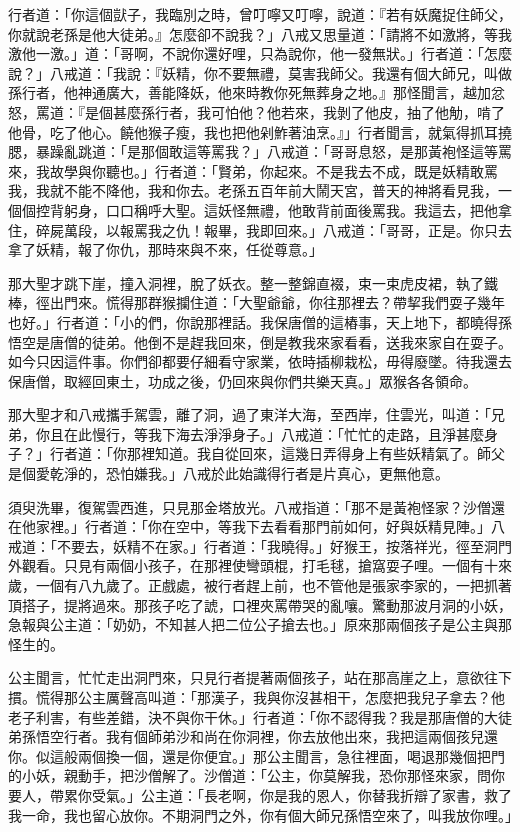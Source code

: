 行者道：「你這個獃子，我臨別之時，曾叮嚀又叮嚀，說道：『若有妖魔捉住師父，你就說老孫是他大徒弟。』怎麼卻不說我？」八戒又思量道：「請將不如激將，等我激他一激。」道：「哥啊，不說你還好哩，只為說你，他一發無狀。」行者道：「怎麼說？」八戒道：「我說：『妖精，你不要無禮，莫害我師父。我還有個大師兄，叫做孫行者，他神通廣大，善能降妖，他來時教你死無葬身之地。』那怪聞言，越加忿怒，罵道：『是個甚麼孫行者，我可怕他？他若來，我剝了他皮，抽了他觔，啃了他骨，吃了他心。饒他猴子瘦，我也把他剁鮓著油烹。』」行者聞言，就氣得抓耳撓腮，暴躁亂跳道：「是那個敢這等罵我？」八戒道：「哥哥息怒，是那黃袍怪這等罵來，我故學與你聽也。」行者道：「賢弟，你起來。不是我去不成，既是妖精敢罵我，我就不能不降他，我和你去。老孫五百年前大鬧天宮，普天的神將看見我，一個個控背躬身，口口稱呼大聖。這妖怪無禮，他敢背前面後罵我。我這去，把他拿住，碎屍萬段，以報罵我之仇！報畢，我即回來。」八戒道：「哥哥，正是。你只去拿了妖精，報了你仇，那時來與不來，任從尊意。」

那大聖才跳下崖，撞入洞裡，脫了妖衣。整一整錦直裰，束一束虎皮裙，執了鐵棒，徑出門來。慌得那群猴攔住道：「大聖爺爺，你往那裡去？帶挈我們耍子幾年也好。」行者道：「小的們，你說那裡話。我保唐僧的這樁事，天上地下，都曉得孫悟空是唐僧的徒弟。他倒不是趕我回來，倒是教我來家看看，送我來家自在耍子。如今只因這件事。你們卻都要仔細看守家業，依時插柳栽松，毋得廢墜。待我還去保唐僧，取經回東土，功成之後，仍回來與你們共樂天真。」眾猴各各領命。

那大聖才和八戒攜手駕雲，離了洞，過了東洋大海，至西岸，住雲光，叫道：「兄弟，你且在此慢行，等我下海去淨淨身子。」八戒道：「忙忙的走路，且淨甚麼身子？」行者道：「你那裡知道。我自從回來，這幾日弄得身上有些妖精氣了。師父是個愛乾淨的，恐怕嫌我。」八戒於此始識得行者是片真心，更無他意。

須臾洗畢，復駕雲西進，只見那金塔放光。八戒指道：「那不是黃袍怪家？沙僧還在他家裡。」行者道：「你在空中，等我下去看看那門前如何，好與妖精見陣。」八戒道：「不要去，妖精不在家。」行者道：「我曉得。」好猴王，按落祥光，徑至洞門外觀看。只見有兩個小孩子，在那裡使彎頭棍，打毛毬，搶窩耍子哩。一個有十來歲，一個有八九歲了。正戲處，被行者趕上前，也不管他是張家李家的，一把抓著頂搭子，提將過來。那孩子吃了諕，口裡夾罵帶哭的亂嚷。驚動那波月洞的小妖，急報與公主道：「奶奶，不知甚人把二位公子搶去也。」原來那兩個孩子是公主與那怪生的。

公主聞言，忙忙走出洞門來，只見行者提著兩個孩子，站在那高崖之上，意欲往下摜。慌得那公主厲聲高叫道：「那漢子，我與你沒甚相干，怎麼把我兒子拿去？他老子利害，有些差錯，決不與你干休。」行者道：「你不認得我？我是那唐僧的大徒弟孫悟空行者。我有個師弟沙和尚在你洞裡，你去放他出來，我把這兩個孩兒還你。似這般兩個換一個，還是你便宜。」那公主聞言，急往裡面，喝退那幾個把門的小妖，親動手，把沙僧解了。沙僧道：「公主，你莫解我，恐你那怪來家，問你要人，帶累你受氣。」公主道：「長老啊，你是我的恩人，你替我折辯了家書，救了我一命，我也留心放你。不期洞門之外，你有個大師兄孫悟空來了，叫我放你哩。」

